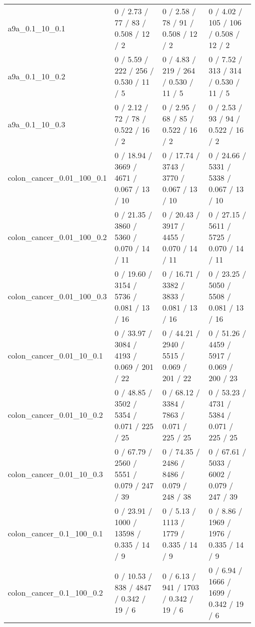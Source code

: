 \begin{tabular}{llll}
            a9a\_0.1\_10\_0.1 &      0 / 2.73 /     77 /      83 / 0.508 /     12 /      2 &      0 / 2.58 /     78 /      91 / 0.508 /     12 /      2 &      0 / 4.02 /    105 /     106 / 0.508 /     12 /      2 \\
            a9a\_0.1\_10\_0.2 &      0 / 5.59 /    222 /     256 / 0.530 /     11 /      5 &      0 / 4.83 /    219 /     264 / 0.530 /     11 /      5 &      0 / 7.52 /    313 /     314 / 0.530 /     11 /      5 \\
            a9a\_0.1\_10\_0.3 &      0 / 2.12 /     72 /      78 / 0.522 /     16 /      2 &      0 / 2.95 /     68 /      85 / 0.522 /     16 /      2 &      0 / 2.53 /     93 /      94 / 0.522 /     16 /      2 \\
 colon\_cancer\_0.01\_100\_0.1 &     0 / 18.94 /   3669 /    4671 / 0.067 /     13 /     10 &     0 / 17.74 /   3743 /    3770 / 0.067 /     13 /     10 &     0 / 24.66 /   5331 /    5338 / 0.067 /     13 /     10 \\
 colon\_cancer\_0.01\_100\_0.2 &     0 / 21.35 /   3860 /    5360 / 0.070 /     14 /     11 &     0 / 20.43 /   3917 /    4455 / 0.070 /     14 /     11 &     0 / 27.15 /   5611 /    5725 / 0.070 /     14 /     11 \\
 colon\_cancer\_0.01\_100\_0.3 &     0 / 19.60 /   3154 /    5736 / 0.081 /     13 /     16 &     0 / 16.71 /   3382 /    3833 / 0.081 /     13 /     16 &     0 / 23.25 /   5050 /    5508 / 0.081 /     13 /     16 \\
  colon\_cancer\_0.01\_10\_0.1 &     0 / 33.97 /   3084 /    4193 / 0.069 /    201 /     22 &     0 / 44.21 /   2940 /    5515 / 0.069 /    201 /     22 &     0 / 51.26 /   4459 /    5917 / 0.069 /    200 /     23 \\
  colon\_cancer\_0.01\_10\_0.2 &     0 / 48.85 /   3502 /    5354 / 0.071 /    225 /     25 &     0 / 68.12 /   3384 /    7863 / 0.071 /    225 /     25 &     0 / 53.23 /   4731 /    5384 / 0.071 /    225 /     25 \\
  colon\_cancer\_0.01\_10\_0.3 &     0 / 67.79 /   2560 /    5551 / 0.079 /    247 /     39 &     0 / 74.35 /   2486 /    8486 / 0.079 /    248 /     38 &     0 / 67.61 /   5033 /    6002 / 0.079 /    247 /     39 \\
  colon\_cancer\_0.1\_100\_0.1 &     0 / 23.91 /   1000 /   13598 / 0.335 /     14 /      9 &      0 / 5.13 /   1113 /    1779 / 0.335 /     14 /      9 &      0 / 8.86 /   1969 /    1976 / 0.335 /     14 /      9 \\
  colon\_cancer\_0.1\_100\_0.2 &     0 / 10.53 /    838 /    4847 / 0.342 /     19 /      6 &      0 / 6.13 /    941 /    1703 / 0.342 /     19 /      6 &      0 / 6.94 /   1666 /    1699 / 0.342 /     19 /      6 \\

\end{tabular}
